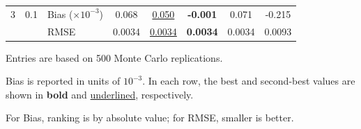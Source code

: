 \begin{table}[!htbp]
\begin{threeparttable}
\begin{tabular}{lllccccc}
3 & 0.1 & Bias ($\times 10^{-3}$) & 0.068 & \underline{0.050} & \textbf{-0.001} & 0.071 & -0.215 \\
 &  & RMSE & 0.0034 & \underline{0.0034} & \textbf{0.0034} & 0.0034 & 0.0093 \\
\bottomrule
\end{tabular}
\begin{tablenotes}[flushleft]
\footnotesize
\item Entries are based on 500 Monte Carlo replications.
\item Bias is reported in units of $10^{-3}$. In each row, the best and second-best values are shown in \textbf{bold} and \underline{underlined}, respectively.
\item For Bias, ranking is by absolute value; for RMSE, smaller is better.
\end{tablenotes}
\end{threeparttable}
\end{table}

